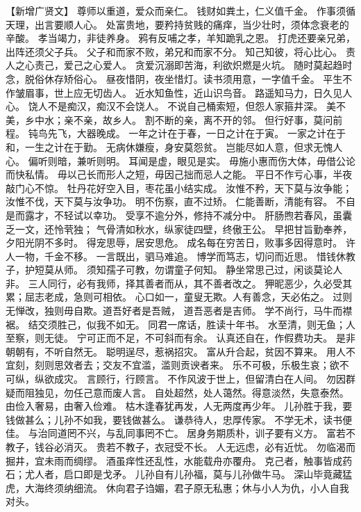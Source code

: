 \documentclass[12pt,UTF8]{ctexbook}
\begin{document}
【新增广贤文】
尊师以重道，爱众而亲仁。
钱财如粪土，仁义值千金。
作事须循天理，出言要顺人心。
处富贵地，要矜持贫贱的痛痒，当少壮时，须体念衰老的辛酸。
孝当竭力，非徒养身。
鸦有反哺之孝，羊知跪乳之恩。
打虎还要亲兄弟，出阵还须父子兵。
父子和而家不败，弟兄和而家不分。
知己知彼，将心比心。
责人之心责己，爱己之心爱人。
贪爱沉溺即苦海，利欲炽燃是火坑。
随时莫起趋时念，脱俗休存矫俗心。
昼夜惜阴，夜坐惜灯。读书须用意，一字值千金。
平生不作皱眉事，世上应无切齿人。
近水知鱼性，近山识鸟音。
路遥知马力，日久见人心。
饶人不是痴汉，痴汉不会饶人。
不说自己桶索短，但怨人家箍井深。
美不美，乡中水；亲不亲，故乡人。
割不断的亲，离不开的邻。
但行好事，莫问前程。
钝鸟先飞，大器晚成。
一年之计在于春，一日之计在于寅。
一家之计在于和，一生之计在于勤。
无病休嫌瘦，身安莫怨贫。
岂能尽如人意，但求无愧人心。
偏听则暗，兼听则明。
耳闻是虚，眼见是实。
毋施小惠而伤大体，毋借公论而快私情。
毋以己长而形人之短，毋因己拙而忌人之能。
平日不作亏心事，半夜敲门心不惊。
牡丹花好空入目，枣花虽小结实成。
汝惟不矜，天下莫与汝争能；汝惟不伐，天下莫与汝争功。
明不伤察，直不过矫。
仁能善断，清能有容。
不自是而露才，不轻试以幸功。
受享不逾分外，修持不减分中。
肝肠煦若春风，虽囊乏一文，还怜茕独；
气骨清如秋水，纵家徒四壁，终傲王公。
早把甘旨勤奉养，夕阳光阴不多时。
得宠思辱，居安思危。
成名每在穷苦日，败事多因得意时。
许人一物，千金不移。
一言既出，驷马难追。
博学而笃志，切问而近思。
惜钱休教子，护短莫从师。
须知孺子可教，勿谓童子何知。
静坐常思己过，闲谈莫论人非。
三人同行，必有我师，择其善者而从，其不善者改之。
狎昵恶少，久必受其累；屈志老成，急则可相依。
心口如一，童叟无欺。人有善念，天必佑之。
过则无惮改，独则毋自欺。道吾好者是吾贼，
道吾恶者是吉师。
学不尚行，马牛而襟裾。
结交须胜己，似我不如无。
同君一席话，胜读十年书。
水至清，则无鱼；人至察，则无徒。
宁可正而不足，不可斜而有余。
认真还自在，作假费功夫。
是非朝朝有，不听自然无。
聪明逞尽，惹祸招灾。
富从升合起，贫因不算来。
用人不宜刻，刻则思效者去；交友不宜滥，滥则贡谀者来。
乐不可极，乐极生哀；欲不可纵，纵欲成灾。
言顾行，行顾言。
不作风波于世上，但留清白在人间。
勿因群疑而阻独见，勿任己意而废人言。
自处超然，处人蔼然。得意淡然，失意泰然。
由俭入奢易，由奢入俭难。
枯木逢春犹再发，人无两度再少年。
儿孙胜于我，要钱做甚么；儿孙不如我，要钱做甚么。
谦恭待人，忠厚传家。
不学无术，读书便佳。
与治同道罔不兴，与乱同事罔不亡。
居身务期质朴，训子要有义方。
富若不教子，钱谷必消灭。
贵若不教子，衣冠受不长。
人无远虑，必有近忧。
勿临渴而掘井，宜未雨而绸缪。
酒虽痒性还乱性，水能载舟亦覆舟。
克己者，触事皆成药石；尤人者，启口即是戈矛。
儿孙自有儿孙福，莫与儿孙做牛马。
深山毕竟藏猛虎，大海终须纳细流。
休向君子诌媚，君子原无私惠；休与小人为仇，小人自我对头。
\end{document}
